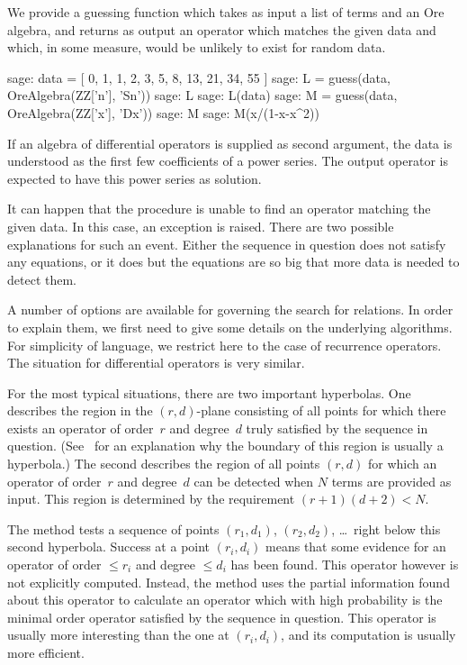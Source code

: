 \documentclass[11pt]{amsart}
\begin{document}
We provide a guessing function which takes as input a list of terms and an Ore
algebra, and returns as output an operator which matches the given data and
which, in some measure, would be unlikely to exist for random data.

\begin{sageexample}
  sage: data = [ 0, 1, 1, 2, 3, 5, 8, 13, 21, 34, 55 ]
  sage: L = guess(data, OreAlgebra(ZZ['n'], 'Sn'))
  sage: L
  sage: L(data)
  sage: M = guess(data, OreAlgebra(ZZ['x'], 'Dx'))
  sage: M
  sage: M(x/(1-x-x^2))
\end{sageexample}

If an algebra of differential operators is supplied as second argument, the data
is understood as the first few coefficients of a power series. The output
operator is expected to have this power series as solution.

It can happen that the procedure is unable to find an operator matching the 
given data. In this case, an exception is raised. There are two possible 
explanations for such an event. Either the sequence in question does not 
satisfy any equations, or it does but the equations are so big that more
data is needed to detect them. 

A number of options are available for governing the search for relations.  In
order to explain them, we first need to give some details on the underlying
algorithms. For simplicity of language, we restrict here to the case of
recurrence operators. The situation for differential operators is very similar.

For the most typical situations, there are two important hyperbolas. One
describes the region in the $(r,d)$-plane consisting of all points for which
there exists an operator of order~$r$ and degree~$d$ truly satisfied by the
sequence in question. (See~\cite{jaroschek13a} for an explanation why the
boundary of this region is usually a hyperbola.) The second describes the region
of all points $(r,d)$ for which an operator of order~$r$ and degree~$d$ can be
detected when $N$ terms are provided as input. This region is determined by the
requirement $(r+1)(d+2)<N$.

The method tests a sequence of points $(r_1,d_1)$, $(r_2,d_2)$, \dots\ right
below this second hyperbola. Success at a point $(r_i,d_i)$ means that some
evidence for an operator of order $\leq r_i$ and degree $\leq d_i$ has been found. 
This operator however is not explicitly computed. Instead, the method uses the
partial information found about this operator to calculate an operator which with 
high probability is the minimal order operator satisfied by the sequence in question. 
This operator is usually more interesting than the one at $(r_i,d_i)$, and its 
computation is usually more efficient. 
\end{document}
